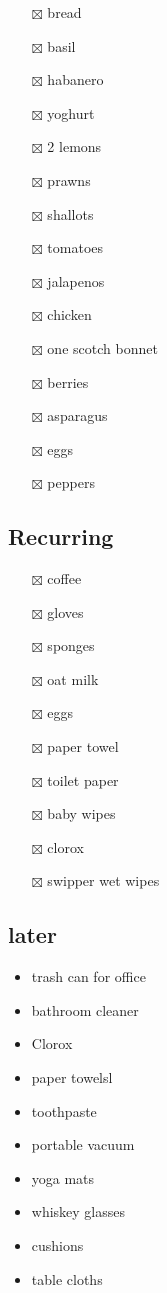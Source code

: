 \documentclass[
]{article}
\providecommand{\tightlist}{%
  \setlength{\itemsep}{0pt}\setlength{\parskip}{0pt}}
\begin{document}
\begin{itemize}
\item[$\boxtimes$]
  bread
\item[$\boxtimes$]
  basil
\item[$\boxtimes$]
  habanero
\item[$\boxtimes$]
  yoghurt
\item[$\boxtimes$]
  2 lemons
\item[$\boxtimes$]
  prawns
\item[$\boxtimes$]
  shallots
\item[$\boxtimes$]
  tomatoes
\item[$\boxtimes$]
  jalapenos
\item[$\boxtimes$]
  chicken
\item[$\boxtimes$]
  one scotch bonnet
\item[$\boxtimes$]
  berries
\item[$\boxtimes$]
  asparagus
\item[$\boxtimes$]
  eggs
\item[$\boxtimes$]
  peppers
\end{itemize}

\hypertarget{recurring}{%
\subsection{Recurring}\label{recurring}}

\begin{itemize}
\tightlist
\item[$\boxtimes$]
  coffee
\item[$\boxtimes$]
  gloves
\item[$\boxtimes$]
  sponges
\item[$\boxtimes$]
  oat milk
\item[$\boxtimes$]
  eggs
\item[$\boxtimes$]
  paper towel
\item[$\boxtimes$]
  toilet paper
\item[$\boxtimes$]
  baby wipes
\item[$\boxtimes$]
  clorox
\item[$\boxtimes$]
  swipper wet wipes
\end{itemize}

\hypertarget{later}{%
\subsection{later}\label{later}}

\begin{itemize}
\tightlist
\item
  trash can for office
\item
  bathroom cleaner
\item
  Clorox
\item
  paper towelsl
\item
  toothpaste
\item
  portable vacuum
\item
  yoga mats
\item
  whiskey glasses
\item
  cushions
\item
  table cloths
\end{itemize}
\end{document}
